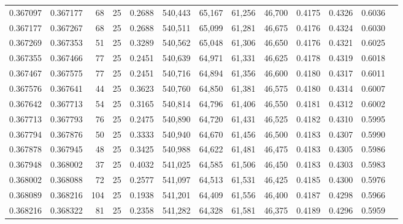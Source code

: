 \begin{tabular}{rrrrrrrrrrrrr}
0.367097 & 0.367177 &    68 &  25 &                                     0.2688 & 540,443 &  65,167 &  61,256 &  46,700 & 0.4175 & 0.4326 & 0.6036 \\
0.367177 & 0.367267 &    68 &  25 &                                     0.2688 & 540,511 &  65,099 &  61,281 &  46,675 & 0.4176 & 0.4324 & 0.6030 \\
0.367269 & 0.367353 &    51 &  25 &                                     0.3289 & 540,562 &  65,048 &  61,306 &  46,650 & 0.4176 & 0.4321 & 0.6025 \\
0.367355 & 0.367466 &    77 &  25 &                                     0.2451 & 540,639 &  64,971 &  61,331 &  46,625 & 0.4178 & 0.4319 & 0.6018 \\
0.367467 & 0.367575 &    77 &  25 &                                     0.2451 & 540,716 &  64,894 &  61,356 &  46,600 & 0.4180 & 0.4317 & 0.6011 \\
0.367576 & 0.367641 &    44 &  25 &                                     0.3623 & 540,760 &  64,850 &  61,381 &  46,575 & 0.4180 & 0.4314 & 0.6007 \\
0.367642 & 0.367713 &    54 &  25 &                                     0.3165 & 540,814 &  64,796 &  61,406 &  46,550 & 0.4181 & 0.4312 & 0.6002 \\
0.367713 & 0.367793 &    76 &  25 &                                     0.2475 & 540,890 &  64,720 &  61,431 &  46,525 & 0.4182 & 0.4310 & 0.5995 \\
0.367794 & 0.367876 &    50 &  25 &                                     0.3333 & 540,940 &  64,670 &  61,456 &  46,500 & 0.4183 & 0.4307 & 0.5990 \\
0.367878 & 0.367945 &    48 &  25 &                                     0.3425 & 540,988 &  64,622 &  61,481 &  46,475 & 0.4183 & 0.4305 & 0.5986 \\
0.367948 & 0.368002 &    37 &  25 &                                     0.4032 & 541,025 &  64,585 &  61,506 &  46,450 & 0.4183 & 0.4303 & 0.5983 \\
0.368002 & 0.368088 &    72 &  25 &                                     0.2577 & 541,097 &  64,513 &  61,531 &  46,425 & 0.4185 & 0.4300 & 0.5976 \\
0.368089 & 0.368216 &   104 &  25 &                                     0.1938 & 541,201 &  64,409 &  61,556 &  46,400 & 0.4187 & 0.4298 & 0.5966 \\
0.368216 & 0.368322 &    81 &  25 &                                     0.2358 & 541,282 &  64,328 &  61,581 &  46,375 & 0.4189 & 0.4296 & 0.5959 \\

\end{tabular}
